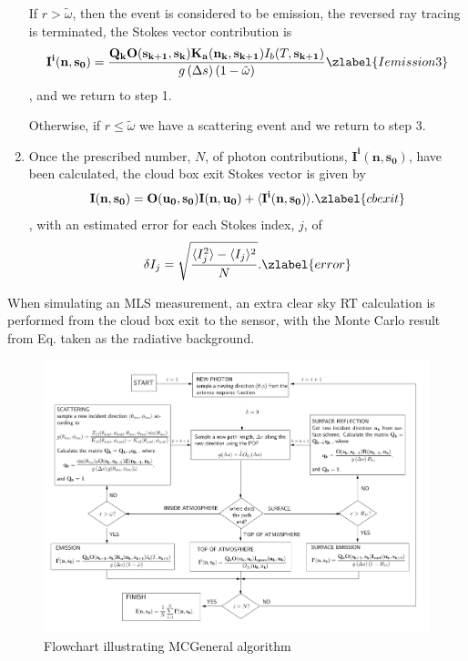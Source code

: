 \begin{enumerate}
If $r>\tilde{\omega}$, then the event is considered to be emission,
the reversed ray tracing is terminated, the Stokes vector contribution is
\begin{equation}
\mathbf{I^i(n,s_0)}=\frac{\mathbf{Q_k O(s_{k+1},s_k)}
  \mathbf{K_a(n_k,s_{k+1})} I_b(T,\mathbf{s_{k+1}})}
  {g\left(\Delta s\right)\left(1-\tilde{\omega}\right)}
\zlabel{Iemission3}
\end{equation}
, and we return to step 1.

Otherwise, if $r\le\tilde{\omega}$
we have a scattering event and we return to step 3.
\item
Once the prescribed number, $N$,  of photon contributions,
$\mathbf{I^i(n,s_0)}$, have been calculated, the cloud box exit Stokes
vector is given by
\begin{equation}
\mathbf{I(n,s_0)}=\mathbf{O(u_0,s_0)I(n,u_0)}+\langle\mathbf{I^i(n,s_0)}\rangle.
\zlabel{cbexit}
\end{equation}
, with an estimated error for each Stokes index, $j$,  of
\begin{equation}
\delta I_j=\sqrt{\frac{\langle I_j^2\rangle-\langle I_j\rangle^2}{N}}.
\zlabel{error}
\end{equation}
\end{enumerate}
When simulating an MLS measurement, an extra clear sky RT calculation
is performed from the cloud box exit to the sensor, with the Monte
Carlo result from Eq.  taken as the radiative background.

\begin{figure}[!ht]
\begin{center}
\includegraphics[width=\vsize,angle=90]{flowchart2}
\caption{Flowchart illustrating MCGeneral algorithm}
\end{center}
\end{figure}

 

